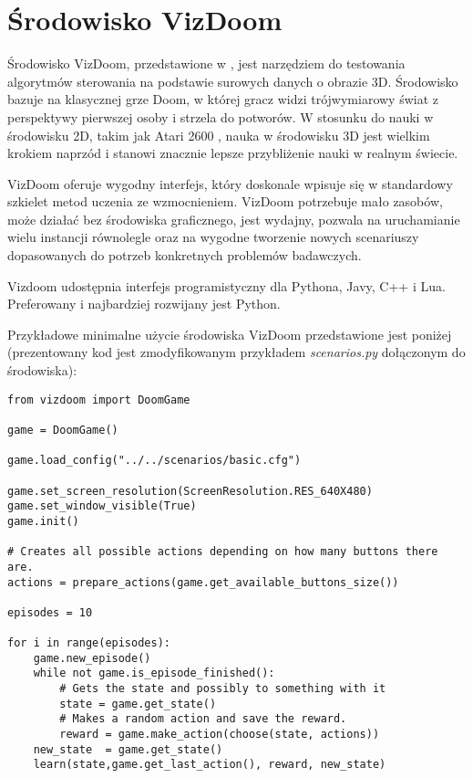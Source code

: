 \section{Środowisko VizDoom}

Środowisko VizDoom, przedstawione w \cite{DBLP:journals/corr/KempkaWRTJ16}, jest narzędziem do testowania algorytmów sterowania na podstawie surowych danych o obrazie 3D. Środowisko bazuje na klasycznej grze Doom, w której gracz widzi trójwymiarowy świat z perspektywy pierwszej osoby i strzela do potworów. W stosunku do nauki w środowisku 2D, takim jak Atari 2600 \cite{mnih2015human}, nauka w środowisku  3D jest wielkim krokiem naprzód i stanowi znacznie lepsze przybliżenie nauki w realnym świecie.

VizDoom oferuje wygodny interfejs, który doskonale wpisuje się w standardowy szkielet metod uczenia ze wzmocnieniem. VizDoom potrzebuje mało zasobów, może działać bez środowiska graficznego, jest wydajny, pozwala na uruchamianie wielu instancji równolegle oraz na wygodne tworzenie nowych scenariuszy dopasowanych do potrzeb konkretnych problemów badawczych.

Vizdoom udostępnia interfejs programistyczny dla Pythona, Javy, C++ i Lua. Preferowany i najbardziej rozwijany jest Python.

Przykładowe minimalne użycie środowiska VizDoom przedstawione jest poniżej (prezentowany kod jest zmodyfikowanym przykładem \textit{scenarios.py} dołączonym do środowiska):

\begin{lstlisting}[language=iPython]
from vizdoom import DoomGame

game = DoomGame()

game.load_config("../../scenarios/basic.cfg")

game.set_screen_resolution(ScreenResolution.RES_640X480)
game.set_window_visible(True)
game.init()

# Creates all possible actions depending on how many buttons there are.
actions = prepare_actions(game.get_available_buttons_size())

episodes = 10

for i in range(episodes):
    game.new_episode()
    while not game.is_episode_finished():
        # Gets the state and possibly to something with it
        state = game.get_state()
        # Makes a random action and save the reward.
        reward = game.make_action(choose(state, actions))
	new_state  = game.get_state() 
	learn(state,game.get_last_action(), reward, new_state)
\end{lstlisting}
